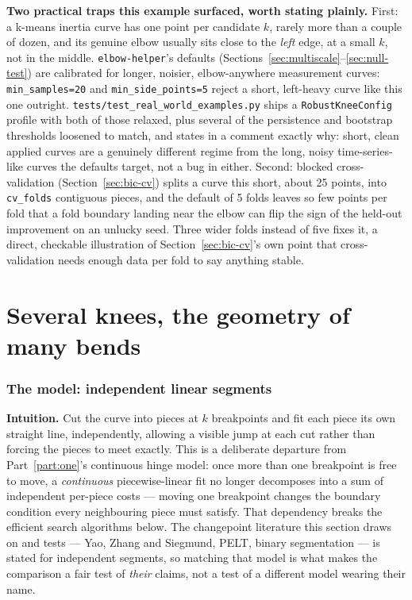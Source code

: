 \documentclass[11pt]{article}
\newcommand{\code}[1]{\texttt{#1}}
\begin{document}
\textbf{Two practical traps this example surfaced, worth stating plainly.}
First: a k-means inertia curve has one point per candidate $k$, rarely more
than a couple of dozen, and its genuine elbow usually sits close to the
\emph{left} edge, at a small $k$, not in the middle. \code{elbow-helper}'s
defaults (Sections~\ref{sec:multiscale}--\ref{sec:null-test}) are calibrated
for longer, noisier, elbow-anywhere measurement curves:
\code{min\_samples=20} and \code{min\_side\_points=5} reject a short,
left-heavy curve like this one outright.
\code{tests/test\_real\_world\_examples.py} ships a \code{RobustKneeConfig}
profile with both of those relaxed, plus several of the persistence and
bootstrap thresholds loosened to match, and states in a comment exactly why:
short, clean applied curves are a genuinely different regime from the long,
noisy time-series-like curves the defaults target, not a bug in either.
Second: blocked cross-validation (Section~\ref{sec:bic-cv}) splits a curve
this short, about 25 points, into \code{cv\_folds} contiguous pieces, and
the default of 5 folds leaves so few points per fold that a fold boundary
landing near the elbow can flip the sign of the held-out improvement on an
unlucky seed. Three wider folds instead of five fixes it, a direct,
checkable illustration of Section~\ref{sec:bic-cv}'s own point that
cross-validation needs enough data per fold to say anything stable.

\part{Several knees, the geometry of many bends}
\label{part:several}

\section{The model: independent linear segments}

\textbf{Intuition.} Cut the curve into pieces at $k$ breakpoints and fit
each piece its own straight line, independently, allowing a visible jump at
each cut rather than forcing the pieces to meet exactly. This is a
deliberate departure from Part~\ref{part:one}'s continuous hinge model: once
more than one breakpoint is free to move, a \emph{continuous}
piecewise-linear fit no longer decomposes into a sum of independent
per-piece costs --- moving one breakpoint changes the boundary condition
every neighbouring piece must satisfy. That dependency breaks the efficient
search algorithms below. The changepoint literature this section draws on
and tests --- Yao, Zhang and Siegmund, PELT, binary segmentation --- is
stated for independent segments, so matching that model is what makes the
comparison a fair test of \emph{their} claims, not a test of a different
model wearing their name.
\end{document}
